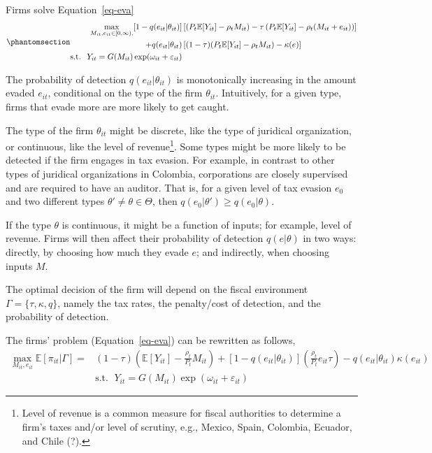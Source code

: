 \documentclass[
  12pt]{article}
\theoremstyle{definition}
\theoremstyle{remark}
\begin{document}
Firms solve Equation~\ref{eq-eva}
\begin{equation}\phantomsection\label{eq-eva}{
\begin{aligned}
  \max_{M_{it}, e_{it}\in [0,\infty), } [1-q(e_{it}|\theta_{it})]&\left[(P_t\mathbb{E}[Y_{it}]-\rho_{t} M_{it})-\tau\left(P_t\mathbb{E}[Y_{it}]-\rho_{t} (M_{it}+e_{it})\right)\right]\\
  +q(e_{it}|\theta_{it})&\left[(1-\tau)(P_t\mathbb{E}[Y_{it}]-\rho_{t} M_{it})-\kappa(e)\right] \\
  \text{s.t. }\; Y_{it}=G(M_{it})\exp(\omega_{it}+\varepsilon_{it})
\end{aligned}
}\end{equation}

The probability of detection \(q(e_{it}|\theta_{it})\) is monotonically
increasing in the amount evaded \(e_{it}\), conditional on the type of
the firm \(\theta_{it}\). Intuitively, for a given type, firms that
evade more are more likely to get caught.

The type of the firm \(\theta_{it}\) might be discrete, like the type of
juridical organization, or continuous, like the level of
revenue\footnote{Level of revenue is a common measure for fiscal
  authorities to determine a firm's taxes and/or level of scrutiny,
  e.g., Mexico, Spain, Colombia, Ecuador, and Chile (?).}. Some types
might be more likely to be detected if the firm engages in tax evasion.
For example, in contrast to other types of juridical organizations in
Colombia, corporations are closely supervised and are required to have
an auditor. That is, for a given level of tax evasion \(e_0\) and two
different types \(\theta' \not= \theta \in \mathbfcal{\Theta}\), then
\(q(e_0|\theta')\ge q(e_0|\theta)\).

If the type \(\theta\) is continuous, it might be a function of inputs;
for example, level of revenue. Firms will then affect their probability
of detection \(q(e|\theta)\) in two ways: directly, by choosing how much
they evade \(e\); and indirectly, when choosing inputs \(M\).

The optimal decision of the firm will depend on the fiscal environment
\(\Gamma=\{\tau, \kappa, q \}\), namely the tax rates, the penalty/cost
of detection, and the probability of detection.

The firms' problem (Equation~\ref{eq-eva}) can be rewritten as follows,
\[
\begin{aligned}
  \max_{M_{it},e_{it}} \mathbb{E}[\pi_{it}|\Gamma] = &(1-\tau)\left(\mathbb{E}[Y_{it}]-\frac{\rho_{t}}{P_t} M_{it}\right)+[1-q(e_{it}|\theta_{it})]\left(\frac{\rho_{t}}{P_t}e_{it}\tau\right)
  -q(e_{it}|\theta_{it})\kappa(e_{it}) \\
  &\text{s.t. }\; Y_{it}=G(M_{it})\exp(\omega_{it}+\varepsilon_{it})
\end{aligned}
\]
\end{document}
